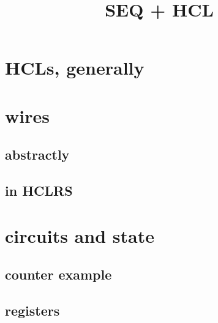 \usepackage{xspace}
\usepackage{cancel}
\title{SEQ + HCL}
\date{}


\begin{frame}
    \titlepage
\end{frame}


\usetikzlibrary{calc,chains,shapes.misc,shapes.callouts,shapes.geometric,shapes.gates.logic.US,circuits.logic.US}
\providecommand{\vemphA}[1]{\myemph<2>{#1}}
\providecommand{\vemphB}[1]{\myemph<3>{#1}}
\providecommand{\vemphC}[1]{\myemph<4>{#1}}

\section{HCLs, generally}


\section{wires}

\subsection{abstractly}

\subsection{in HCLRS}


\section{circuits and state}

\subsection{counter example}




\subsection{registers}



